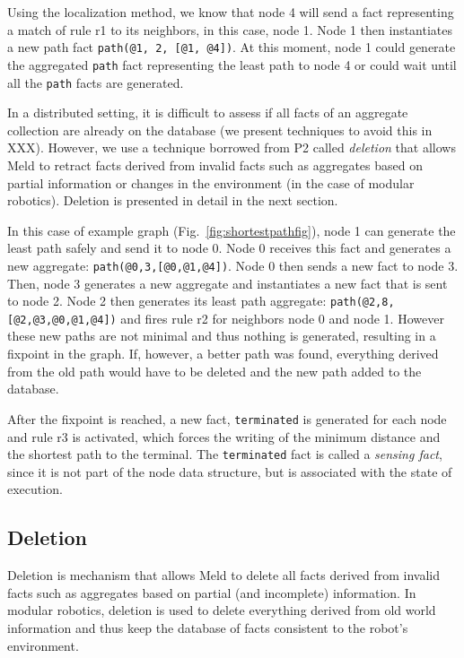 \documentclass[preprint]{sigplanconf}
\begin{document}
Using the localization method, we know that node 4 will send a fact representing
a match of rule r1 to its neighbors, in this case, node 1. Node 1 then instantiates a new
path fact \texttt{path(@1,~2,~[@1, @4])}. At this moment, node 1 could generate the aggregated
\texttt{path} fact representing the least path to node 4 or could wait until all the \texttt{path}
facts are generated.

In a distributed setting, it is difficult to assess if all facts of an
aggregate collection are already on the database (we present techniques to avoid this in XXX).
However, we use a technique borrowed from P2 called \emph{deletion} that allows Meld
to retract facts derived from invalid facts such as aggregates based on partial information
or changes in the environment (in the case of modular robotics). Deletion
is presented in detail in the next section.

In this case of example graph (Fig.~\ref{fig:shortestpathfig}), node 1 can generate the least path
safely and send it to node 0. Node 0 receives this fact and generates a new aggregate: \texttt{path(@0,3,[@0,@1,@4])}. Node 0 then sends a new fact to node 3. Then, node 3 generates a
new aggregate and instantiates a new fact that is sent to node 2. Node 2 then generates its
least path aggregate: \texttt{path(@2,8,[@2,@3,@0,@1,@4])} and fires rule r2 for neighbors
node 0 and node 1. However these new paths are not minimal and thus nothing is generated,
resulting in a fixpoint in the graph. If, however, a better path was found, everything
derived from the old path would have to be deleted and the new path added to the database.

After the fixpoint is reached, a new fact, \texttt{terminated} is generated for each node
and rule r3 is activated, which forces the writing of the minimum distance and the shortest path
to the terminal. The \texttt{terminated} fact is called a \emph{sensing fact}, since it is not
part of the node data structure, but is associated with the state of execution. 

\subsection{Deletion}

Deletion is mechanism that allows Meld to delete all facts derived from invalid facts such
as aggregates based on partial (and incomplete) information. In modular robotics,
deletion is used to delete everything derived from old world information and thus keep the database
of facts consistent to the robot's environment.
\end{document}
